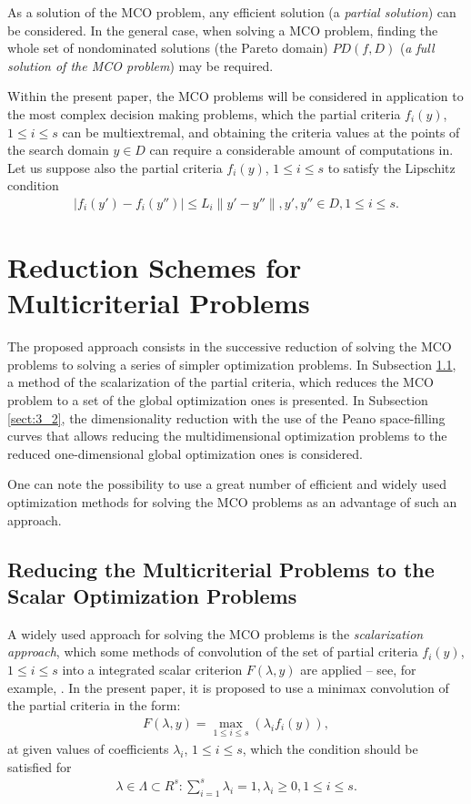 \documentclass[procedia]{easychair}
\begin{document}
As a solution of the MCO problem, any efficient solution (a {\it partial solution}) can be considered. In the general case, when solving a MCO problem, finding the whole set of nondominated solutions (the Pareto domain) $PD(f,D)$ ({\it a full solution of the MCO problem}) may be required. \par

Within the present paper, the MCO problems will be considered in application to the most complex decision making problems, which the partial criteria $f_i(y)$, $1 \leq i \leq s$ can be multiextremal, and obtaining the criteria values at the points of the search domain $y \in D$ can require a considerable amount of computations in. Let us suppose also the partial criteria $f_i(y)$, $1 \leq i \leq s$ to satisfy the Lipschitz condition
\begin{eqnarray} \label{eq:02}
|f_i(y') - f_i(y'')| \leq L_i \|y' - y''\|, y', y'' \in D, 1 \leq i \leq s. 
\end{eqnarray}

\section{Reduction Schemes for Multicriterial Problems}
\label{sect:3}
The proposed approach consists in the successive reduction of solving the MCO problems to solving a series of simpler optimization problems. In Subsection \ref{sect:3_1}, a method of the scalarization of the partial criteria, which reduces the MCO problem to a set of the global optimization ones is presented. In Subsection \ref{sect:3_2}, the dimensionality reduction with the use of the Peano space-filling curves that allows reducing the multidimensional optimization problems to the reduced one-dimensional global optimization ones is considered. \par

One can note the possibility to use a great number of efficient and widely used optimization methods for solving the MCO problems as an advantage of such an approach.


\subsection{Reducing the Multicriterial Problems to the Scalar Optimization Problems}
\label{sect:3_1}
A widely used approach for solving the MCO problems is the {\it scalarization approach}, which some methods of convolution of the set of partial criteria $f_i(y)$, $1 \leq i \leq s$ into a integrated scalar criterion $F(\lambda,y)$ are applied -- see, for example, \cite{c7,c8}. In the present paper, it is proposed to use a minimax convolution of the partial criteria in the form:
\begin{eqnarray} \label{eq:04}
F(\lambda,y) = \max_{1 \leq i \leq s}(\lambda_i f_i(y)), 
\end{eqnarray}
at given values of coefficients $\lambda_i$, $1 \leq i \leq s$, which the condition should be satisfied for
\begin{eqnarray*}
   \lambda \in  \Lambda \subset R^s:\sum_{i=1}^s{\lambda_i} = 1, \lambda_i \geq 0, 1 \leq i \leq s.
\end{eqnarray*}
\end{document}

